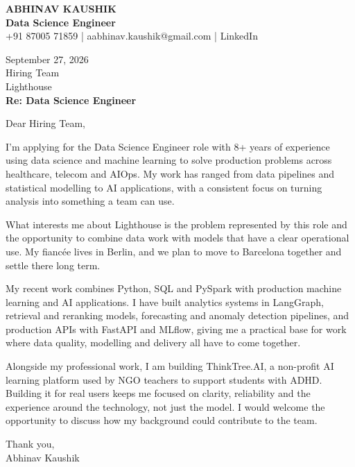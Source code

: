 \documentclass[10pt,a4paper]{article}
\begin{document}
\begin{center}
{\Large\bfseries ABHINAV KAUSHIK}\\[2pt]
{\bfseries Data Science Engineer}\\[2pt]
+91 87005 71859 \quad | \quad aabhinav.kaushik@gmail.com \quad | \quad LinkedIn
\end{center}
\vspace{8pt}
September 27, 2026\\[6pt]
Hiring Team\\
Lighthouse\\[4pt]
\textbf{Re: Data Science Engineer}

Dear Hiring Team,

I’m applying for the Data Science Engineer role with 8+ years of experience using data science and machine learning to solve production problems across healthcare, telecom and AIOps. My work has ranged from data pipelines and statistical modelling to AI applications, with a consistent focus on turning analysis into something a team can use.

What interests me about Lighthouse is the problem represented by this role and the opportunity to combine data work with models that have a clear operational use. My fiancée lives in Berlin, and we plan to move to Barcelona together and settle there long term.

My recent work combines Python, SQL and PySpark with production machine learning and AI applications. I have built analytics systems in LangGraph, retrieval and reranking models, forecasting and anomaly detection pipelines, and production APIs with FastAPI and MLflow, giving me a practical base for work where data quality, modelling and delivery all have to come together.

Alongside my professional work, I am building ThinkTree.AI, a non-profit AI learning platform used by NGO teachers to support students with ADHD. Building it for real users keeps me focused on clarity, reliability and the experience around the technology, not just the model. I would welcome the opportunity to discuss how my background could contribute to the team.

Thank you,\\
Abhinav Kaushik
\end{document}
